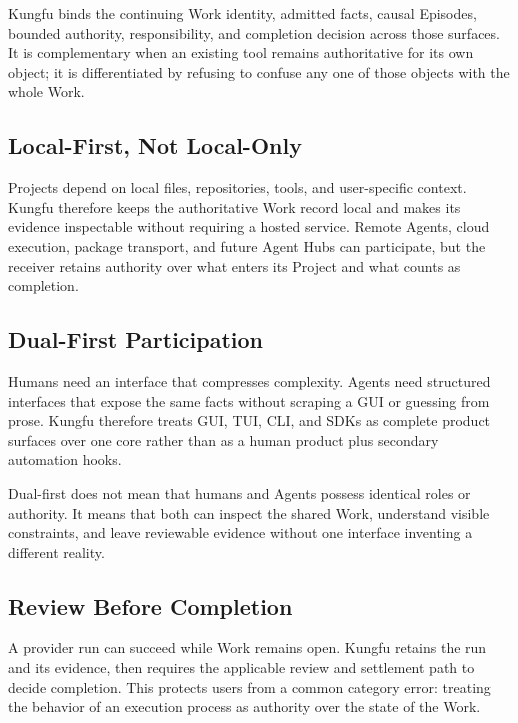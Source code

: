 Kungfu binds the continuing Work identity, admitted facts, causal Episodes,
bounded authority, responsibility, and completion decision across those
surfaces. It is complementary when an existing tool remains authoritative for
its own object; it is differentiated by refusing to confuse any one of those
objects with the whole Work.

\subsection{Local-First, Not Local-Only}

Projects depend on local files, repositories, tools, and user-specific
context. Kungfu therefore keeps the authoritative Work record local and makes
its evidence inspectable without requiring a hosted service. Remote Agents,
cloud execution, package transport, and future Agent Hubs can participate, but
the receiver retains authority over what enters its Project and what counts as
completion.

\subsection{Dual-First Participation}

Humans need an interface that compresses complexity. Agents need structured
interfaces that expose the same facts without scraping a GUI or guessing from
prose. Kungfu therefore treats GUI, TUI, CLI, and SDKs as complete product
surfaces over one core rather than as a human product plus secondary automation
hooks.

Dual-first does not mean that humans and Agents possess identical roles or
authority. It means that both can inspect the shared Work, understand visible
constraints, and leave reviewable evidence without one interface inventing a
different reality.

\subsection{Review Before Completion}

A provider run can succeed while Work remains open. Kungfu retains the run and
its evidence, then requires the applicable review and settlement path to
decide completion. This protects users from a common category error: treating
the behavior of an execution process as authority over the state of the Work.
